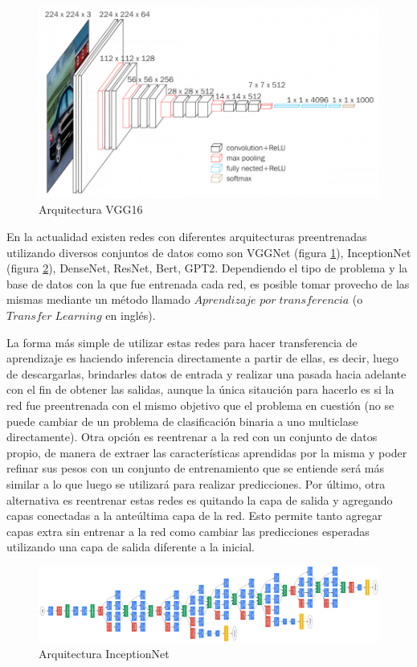 \begin{figure}[!h]
	\centering
	\includegraphics[width=1\linewidth]{images/vgg16}
	\caption[Arquitectura VGG16]{Arquitectura VGG16}
	\label{fig:vgg16}
\end{figure}

En la actualidad existen redes con diferentes arquitecturas preentrenadas utilizando diversos conjuntos de datos como son VGGNet (figura \ref{fig:vgg16}), InceptionNet (figura \ref{fig:googlenet}), DenseNet, ResNet, Bert, GPT2. Dependiendo el tipo de problema y la base de datos con la que fue entrenada cada red, es posible tomar provecho de las mismas mediante un método llamado \(Aprendizaje\) \(por\; transferencia\) (o \(Transfer\;Learning\) en inglés). 

La forma más simple de utilizar estas redes para hacer transferencia de aprendizaje es haciendo inferencia directamente a partir de ellas, es decir, luego de descargarlas, brindarles datos de entrada y realizar una pasada hacia adelante con el fin de obtener las salidas, aunque la única sitaución para hacerlo es si la red fue preentrenada con el mismo objetivo que el problema en cuestión (no se puede cambiar de un problema de clasificación binaria a uno multiclase directamente). Otra opción es reentrenar a la red con un conjunto de datos propio, de manera de extraer las características aprendidas por la misma y poder refinar sus pesos con un conjunto de entrenamiento que se entiende será más similar a lo que luego se utilizará para realizar predicciones. Por último, otra alternativa es reentrenar estas redes es quitando la capa de salida y agregando capas conectadas a la anteúltima capa de la red. Esto permite tanto agregar capas extra sin entrenar a la red como cambiar las predicciones esperadas utilizando una capa de salida diferente a la inicial.

\begin{figure}
	\centering
	\includegraphics[width=1\linewidth]{images/googlenet}
	\caption[Arquitectura InceptionNet]{Arquitectura InceptionNet}
	\label{fig:googlenet}
\end{figure}